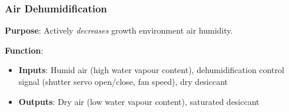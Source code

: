 \documentclass{../tex/report}
\begin{document}
\newpage

\subsubsection{Air Dehumidification}
\label{sec:dehum}

\textbf{Purpose}: Actively \textit{decreases} growth environment air humidity.

\textbf{Function}:
\begin{itemize}
    \item \textbf{Inputs}: Humid air (high water vapour content), dehumidification control signal (shutter servo open/close, fan speed), dry desiccant
    \item \textbf{Outputs}: Dry air (low water vapour content), saturated desiccant
\end{itemize}
\end{document}
